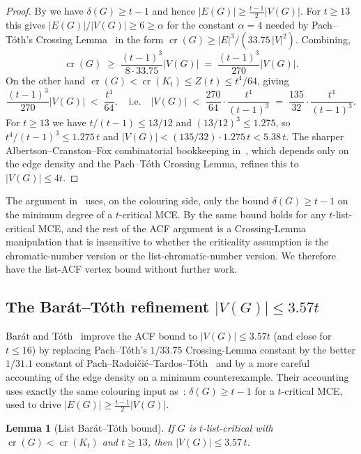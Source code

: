 \documentclass[11pt,a4paper]{article}
\newtheorem{lemma}[theorem]{Lemma}
\theoremstyle{definition}
\DeclareMathOperator{\crN}{cr}
\begin{document}
\begin{proof}
By  we have $\delta(G) \ge t - 1$ and hence
$|E(G)| \ge \tfrac{t-1}{2}|V(G)|$. For $t \ge 13$ this gives
$|E(G)| / |V(G)| \ge 6 \ge \alpha$ for the constant $\alpha = 4$
needed by Pach--T\'oth's Crossing Lemma~\cite{PachToth} in the
form $\crN(G) \ge |E|^3 / (33.75\,|V|^2)$. Combining,
\[
   \crN(G) \;\ge\; \frac{(t-1)^3}{8 \cdot 33.75} |V(G)|
            \;=\; \frac{(t-1)^3}{270} |V(G)|.
\]
On the other hand $\crN(G) < \crN(K_t) \le Z(t) \le t^4 / 64$,
giving
\[
   \frac{(t-1)^3}{270} |V(G)| \;<\; \frac{t^4}{64},
   \quad \text{i.e.}\quad
   |V(G)| \;<\; \frac{270}{64} \cdot \frac{t^4}{(t-1)^3}
   \;=\; \frac{135}{32} \cdot \frac{t^4}{(t-1)^3}.
\]
For $t \ge 13$ we have $t/(t-1) \le 13/12$ and $(13/12)^3 \le
1.275$, so $t^4/(t-1)^3 \le 1.275 \, t$ and
$|V(G)| < (135/32) \cdot 1.275 \, t < 5.38 \, t$. The sharper
Albertson--Cranston--Fox combinatorial bookkeeping
in~\cite[\S 2]{ACF}, which depends only on the edge density and
the Pach--T\'oth Crossing Lemma, refines this to
$|V(G)| \le 4t$.
\end{proof}

The argument in~\cite[\S 2]{ACF} uses, on the colouring side, only
the bound $\delta(G) \ge t - 1$ on the minimum degree of a
$t$-critical MCE. By  the same bound holds
for any $t$-list-critical MCE, and the rest of the ACF argument
is a Crossing-Lemma manipulation that is insensitive to whether
the criticality assumption is the chromatic-number version or the
list-chromatic-number version. We therefore have the list-ACF
vertex bound without further work.

\subsection{The Bar\'at--T\'oth refinement $|V(G)| \le 3.57t$}

Bar\'at and T\'oth~\cite[Theorem~1.2]{BT} improve the ACF bound to
$|V(G)| \le 3.57t$ (and close  for
$t \le 16$) by replacing Pach--T\'oth's $1/33.75$ Crossing-Lemma
constant by the better $1/31.1$ constant of
Pach--Radoi\v{c}i\'c--Tardos--T\'oth~\cite{PRTT} and by a more
careful accounting of the edge density on a minimum counterexample.
Their accounting uses exactly the same colouring input as~\cite{ACF}:
$\delta(G) \ge t - 1$ for a $t$-critical MCE, used to drive
$|E(G)| \ge \tfrac{t-1}{2}|V(G)|$.

\begin{lemma}[List Bar\'at--T\'oth bound]\label{lem:list-bt}
If $G$ is $t$-list-critical with $\crN(G) < \crN(K_t)$ and
$t \ge 13$, then $|V(G)| \le 3.57\,t$.
\end{lemma}
\end{document}
